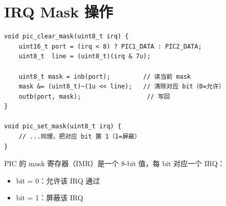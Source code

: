 \section{IRQ Mask 操作}

\begin{lstlisting}[style=cstyle]
void pic_clear_mask(uint8_t irq) {
    uint16_t port = (irq < 8) ? PIC1_DATA : PIC2_DATA;
    uint8_t  line = (uint8_t)(irq & 7u);

    uint8_t mask = inb(port);         // 读当前 mask
    mask &= (uint8_t)~(1u << line);   // 清除对应 bit（0=允许）
    outb(port, mask);                  // 写回
}

void pic_set_mask(uint8_t irq) {
    // ...同理，把对应 bit 置 1（1=屏蔽）
}
\end{lstlisting}

PIC 的 mask 寄存器（IMR）是一个 8-bit 值，每 bit 对应一个 IRQ：
\begin{itemize}
  \item bit = 0：允许该 IRQ 通过
  \item bit = 1：屏蔽该 IRQ
\end{itemize}


